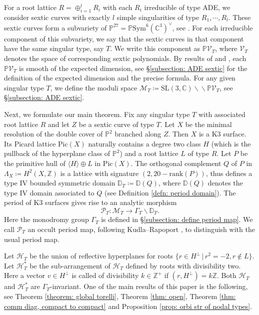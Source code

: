 \documentclass[
]{article}
\begin{document}
For a root lattice \(R=\oplus_{i=1}^l R_i\) with each \(R_i\)
irreducible of type ADE, we consider sextic curves with exactly \(l\)
simple singularities of type \(R_1, \cdots, R_l\). These sextic curves
form a subvariety of
\(\mathbb{P}^{27}=\mathbb{P}\mathrm{Sym}^6(\mathbb{C}^3)^\vee\), see
\cite[Prop 2.1]{greuel1996equianalytic}. For each irreducible component
of this subvariety, we say that the sextic curves in that component have
the same singular type, say \(T\). We write this component as
\(\mathbb{P}\mathcal{V}_T\), where \(\mathcal{V}_T\) denotes the space
of corresponding sextic polynomials. By results of
\cite[Corollary 5.1(b)]{greuel1996equianalytic} and
\cite[Theorem 2.5.1]{greuel2021plane}, each \(\mathbb{P}\mathcal{V}_T\)
is smooth of the expected dimension, see §\ref{subsection: ADE sextic}
for the definition of the expected dimension and the precise formula.
For any given singular type \(T\), we define the moduli space
\(\mathcal{M}_T\coloneqq\mathrm{SL}(3, \mathbb{C})\backslash\!\! \backslash\mathbb{P}\mathcal{V}_T\),
see §\ref{subsection: ADE sextic}.

Next, we formulate our main theorem. Fix any singular type \(T\) with
associated root lattice \(R\) and let \(Z\) be a sextic curve of type
\(T\). Let \(X\) be the minimal resolution of the double cover of
\(\mathbb{P}^2\) branched along \(Z\). Then \(X\) is a K3 surface. Its
Picard lattice \(\mathrm{Pic}(X)\) naturally contains a degree two class
\(H\) (which is the pullback of the hyperplane class of
\(\mathbb{P}^2\)) and a root lattice \(L\) of type \(R\). Let \(P\) be
the primitive hull of \(\langle H\rangle\oplus L\) in
\(\mathrm{Pic}(X)\). The orthogonal complement \(Q\) of \(P\) in
\(\Lambda_X\coloneqq H^2(X,\mathbb{Z})\) is a lattice with signature
\((2,20-\mathrm{rank} (P))\), thus defines a type IV bounded symmetric
domain \(\mathbb{D}_T\coloneqq\mathbb{D}(Q)\), where \(\mathbb{D}(Q)\)
denotes the type IV domain associated to \(Q\) (see Definition
\ref{defn: period domain}). The period of K3 surfaces gives rise to an
analytic morphism
\[\mathscr{P}_T\colon \mathcal{M}_T\to \Gamma_T\backslash\mathbb{D}_T.\]
Here the monodromy group \(\Gamma_T\) is defined in
§\ref{subsection: define period map}. We call \(\mathscr{P}_T\) an
occult period map, following Kudla--Rapoport \cite{kudla2012occult}, to
distinguish with the usual period map.

Let \(\mathcal{H}_T\) be the union of reflective hyperplanes for roots
\(\{ r\in H^\perp \,|\, r^2=-2, r\notin L \}\). Let \(\mathcal{H}_T^*\)
be the sub-arrangement of \(\mathcal{H}_T\) defined by roots with
divisibility two. Here a vector \(v\in H^\perp\) is called of
divisibility \(k\in \mathbb{Z}^+\) if \((r, H^\perp)=k\mathbb{Z}\). Both
\(\mathcal{H}_T\) and \(\mathcal{H}_T^*\) are \(\Gamma_T\)-invariant.
One of the main results of this paper is the following, see Theorem
\ref{theorem: global torelli}, Theorem \ref{thm: open}, Theorem
\ref{thm: comm diag, compact to compact} and Proposition
\ref{prop: orbi str of nodal types}.
\end{document}
